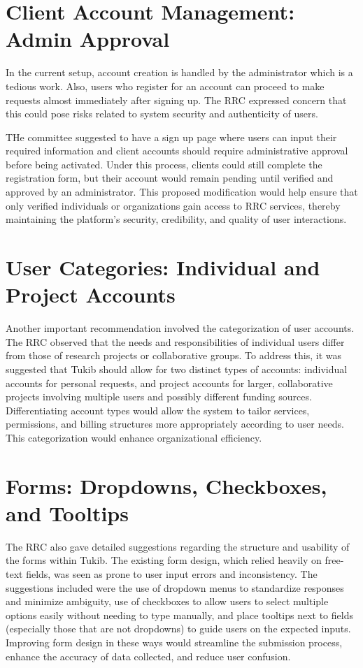 \section{Client Account Management: Admin Approval}
In the current setup, account creation is handled by the administrator which is a tedious work. Also, users who register for an account can proceed to make requests almost immediately after signing up. The RRC expressed concern that this could pose risks related to system security and authenticity of users.

THe committee suggested to have a sign up page where users can input their required information and client accounts should require administrative approval before being activated. Under this process, clients could still complete the registration form, but their account would remain pending until verified and approved by an administrator. This proposed modification would help ensure that only verified individuals or organizations gain access to RRC services, thereby maintaining the platform’s security, credibility, and quality of user interactions.

\section{User Categories: Individual and Project Accounts}
Another important recommendation involved the categorization of user accounts. The RRC observed that the needs and responsibilities of individual users differ from those of research projects or collaborative groups. To address this, it was suggested that Tukib should allow for two distinct types of accounts: individual accounts for personal requests, and project accounts for larger, collaborative projects involving multiple users and possibly different funding sources. Differentiating account types would allow the system to tailor services, permissions, and billing structures more appropriately according to user needs. This categorization would enhance organizational efficiency.

\section{Forms: Dropdowns, Checkboxes, and Tooltips}
The RRC also gave detailed suggestions regarding the structure and usability of the forms within Tukib. The existing form design, which relied heavily on free-text fields, was seen as prone to user input errors and inconsistency. The suggestions included were the use of dropdown menus to standardize responses and minimize ambiguity, use of checkboxes to allow users to select multiple options easily without needing to type manually, and place tooltips next to fields (especially those that are not dropdowns) to guide users on the expected inputs. Improving form design in these ways would streamline the submission process, enhance the accuracy of data collected, and reduce user confusion.


